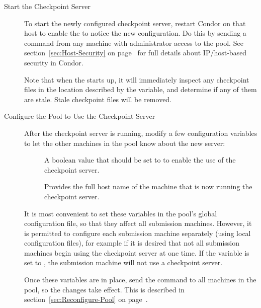 \begin{description}
\begin{description}
\end{description}

\item[Start the Checkpoint Server]

To start the newly configured checkpoint server,
restart Condor on that host to enable
the  to notice the new configuration.
Do this by sending a  command from any machine
with administrator access to the pool.
See section~\ref{sec:Host-Security} on
page~\pageref{sec:Host-Security} for full details about IP/host-based
security in Condor. 

Note that when the  starts up, it will immediately
inspect any checkpoint files in the location described by the
 variable, and determine if any of them are stale.
Stale checkpoint files will be removed.

\item[Configure the Pool to Use the Checkpoint Server]

After the checkpoint server is running,
modify a few configuration variables to let the other machines in the pool
know about the new server:

\begin{description}
   \item[] A boolean value that should be set to
    to enable the use of the checkpoint server.

   \item[] Provides the full host name 
   of the machine that is now running the checkpoint server.  
\end{description}

It is most convenient to set these variables in the pool's
global configuration file,
so that they affect all submission machines.
However, it is permitted to configure each submission machine separately
(using local configuration files), for example if it is desired that not all
submission machines begin using the checkpoint server at one time.
If the variable  is set to ,
the submission machine will not use a checkpoint server.

Once these variables are in place,
send the command  to all machines in the pool,
so the changes take effect.
This is described in section~\ref{sec:Reconfigure-Pool} on
page~\pageref{sec:Reconfigure-Pool}.

\end{description}

